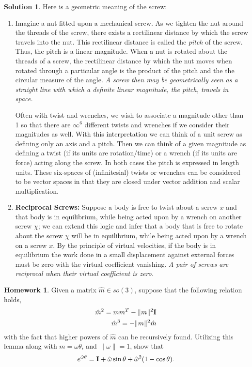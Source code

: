 \documentclass[]{article}
\theoremstyle{definition}
\newtheorem{homework}{Homework}
\newtheorem{solution}{Solution}
\begin{document}
\noindent \begin{solution}
	Here is a geometric meaning of the screw:
	\begin{enumerate}
		\item 
		Imagine a nut fitted upon a mechanical screw. As we tighten the nut around the threads of the screw, there exists a rectilinear distance by which the screw travels into the nut. This rectilinear distance is called the \textit{pitch} of the screw. Thus, the pitch is a linear magnitude. When a nut is rotated about the threads of a screw, the rectilinear distance by which the nut moves when rotated through a particular angle is the product of the pitch and the the circular measure of the angle. \textit{A screw then may be geometrically seen as a straight line with which a definite linear magnitude, \ie the pitch, travels in space.}
		
		Often with twist and wrenches, we wish to associate a magnitude other than 1 so that there are $\infty^6$ different twists and wrenches if we consider their magnitudes as well. With this interpretation we can think of a unit screw as defining only an axis and a pitch. Then we can think of a given magnitude as defining a twist (if its units are rotation/time) or a wrench (if its units are force) acting along the screw. In both cases the pitch is expressed in length units. These six-spaces of (infinitesial) twists or wrenches can be considered to be vector spaces in that they are closed under vector addition and scalar multiplication.
		\item \textbf{Reciprocal Screws:} Suppose a body is free to twist about a screw $x$ and that body is in equilibrium, while being acted upon by a wrench on another screw $\chi$; we can extend this logic and infer that a body that is free to rotate about the screw $\chi$ will be in equilibrium, while being acted upon by a wrench on a screw $x$. By the principle of virtual velocities, if the body is in equilibrium the work done in a small displacement against external forces must be zero with the virtual coefficient vanishing. %
		\textit{A pair of screws are reciprocal when their virtual coefficient is zero.}
	\end{enumerate}
\end{solution}


\noindent 
\begin{homework}
	Given a matrix $\hat{m} \in so(3)$, suppose that the following relation holds,
	\begin{align}
	\hat{m}^2 = m m^T - \|m\|^2 \textbf{I} \\
	\hat{m}^3 = - \|m\|^2 \hat{m}
	\end{align}
	with the fact that higher powers of $\hat{m}$ can be recursively found. Utilizing this lemma along with $m =\omega \theta$, and $\|\omega\| = 1$, show that 
	\begin{align}
	e^{\hat{\omega}\theta}  = \textbf{I} + \hat{\omega} \sin \theta + \hat{\omega}^2(1 - \cos \theta).
	\label{eq:rodrigues}
	\end{align}
\end{homework} 
\end{document}
